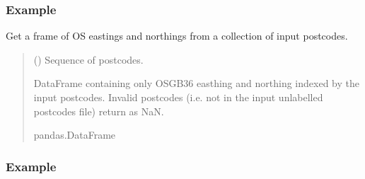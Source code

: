 \documentclass[letterpaper,10pt,english]{sphinxmanual}
\begin{document}
\begin{fulllineitems}
\begin{fulllineitems}
\begin{quote}
\begin{description}
\end{description}\end{quote}
\subsubsection*{Example}

\begin{sphinxVerbatim}[commandchars=\\\{\}]
\end{sphinxVerbatim}

\end{fulllineitems}


\begin{fulllineitems}
\label{\detokenize{index:flood_tool.Tool.get_easting_northing}}
\pysigstartsignatures
{}
\pysigstopsignatures
\sphinxAtStartPar
Get a frame of OS eastings and northings from a collection
of input postcodes.
\begin{quote}\begin{description}
\sphinxAtStartPar
{} () \textendash{} Sequence of postcodes.

\sphinxAtStartPar
DataFrame containing only OSGB36 easthing and northing indexed
by the input postcodes. Invalid postcodes (i.e. not in the
input unlabelled postcodes file) return as NaN.

\sphinxAtStartPar
pandas.DataFrame

\end{description}\end{quote}
\subsubsection*{Example}


\end{fulllineitems}
\end{fulllineitems}
\end{document}
